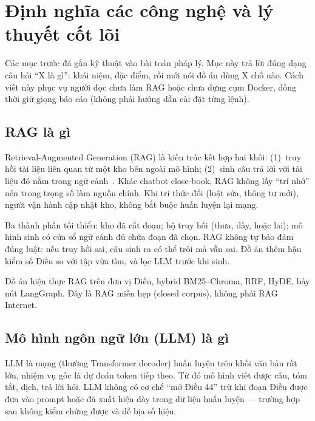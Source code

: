 
\section{Định nghĩa các công nghệ và lý thuyết cốt lõi}

Các mục trước đã gắn kỹ thuật vào bài toán pháp lý. Mục này trả lời đúng dạng
câu hỏi ``X là gì'': khái niệm, đặc điểm, rồi mới nói đồ án dùng X chỗ nào.
Cách viết này phục vụ người đọc chưa làm RAG hoặc chưa dựng cụm Docker, đồng
thời giữ giọng báo cáo (không phải hướng dẫn cài đặt từng lệnh).

\subsection{RAG là gì}

Retrieval-Augmented Generation (RAG) là kiến trúc kết hợp hai khối: (1)~truy hồi
tài liệu liên quan từ một kho bên ngoài mô hình; (2)~sinh câu trả lời với tài
liệu đó nằm trong ngữ cảnh~\cite{lewis2020rag}. Khác chatbot close-book, RAG
không lấy ``trí nhớ'' nén trong trọng số làm nguồn chính. Khi tri thức đổi (luật
sửa, thông tư mới), người vận hành cập nhật kho, không bắt buộc huấn luyện lại
mạng.

Ba thành phần tối thiểu: kho đã cắt đoạn; bộ truy hồi (thưa, dày, hoặc lai);
mô hình sinh có cửa sổ ngữ cảnh đủ chứa đoạn đã chọn. RAG không tự bảo đảm đúng
luật: nếu truy hồi sai, câu sinh ra có thể trôi mà vẫn sai. Đồ án thêm hậu kiểm
số Điều so với tập vừa tìm, và lọc LLM trước khi sinh.

Đồ án hiện thực RAG trên đơn vị Điều, hybrid BM25--Chroma, RRF, HyDE, bảy nút
LangGraph. Đây là RAG miền hẹp (closed corpus), không phải RAG Internet.

\subsection{Mô hình ngôn ngữ lớn (LLM) là gì}

LLM là mạng (thường Transformer decoder) huấn luyện trên khối văn bản rất lớn,
nhiệm vụ gốc là dự đoán token tiếp theo. Từ đó mô hình viết được câu, tóm tắt,
dịch, trả lời hỏi. LLM không có cơ chế ``mở Điều 44'' trừ khi đoạn Điều được
đưa vào prompt hoặc đã xuất hiện dày trong dữ liệu huấn luyện --- trường hợp
sau không kiểm chứng được và dễ bịa số hiệu.

